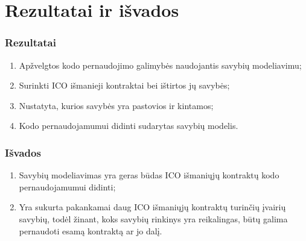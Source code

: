 \documentclass{beamer}
\begin{document}
\section{Rezultatai ir išvados}

\begin{frame}
	\frametitle{Rezultatai}
	\begin{enumerate}
        \item Apžvelgtos kodo pernaudojimo galimybės naudojantis savybių modeliavimu;
        \item Surinkti ICO išmanieji kontraktai bei ištirtos jų savybės;
        \item Nustatyta, kurios savybės yra pastovios ir kintamos;
        \item Kodo pernaudojamumui didinti sudarytas savybių modelis.
	\end{enumerate}
\end{frame}

\begin{frame}
	\frametitle{Išvados}
	\begin{enumerate}
        \item Savybių modeliavimas yra geras būdas ICO išmaniųjų kontraktų kodo pernaudojamumui didinti;
        \item Yra sukurta pakankamai daug ICO išmaniųjų kontraktų turinčių įvairių savybių, todėl žinant, koks savybių rinkinys yra reikalingas, būtų galima pernaudoti esamą kontraktą ar jo dalį.
	\end{enumerate}
\end{frame}
\end{document}
